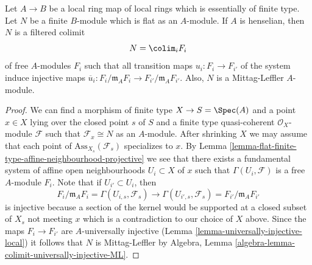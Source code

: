 \begin{lemma}
\label{lemma-flat-finite-type-local-colimit-free}
Let $A \to B$ be a local ring map of local rings which is essentially of
finite type. Let $N$ be a finite $B$-module which is flat as an $A$-module.
If $A$ is henselian, then $N$ is a filtered colimit
$$
N = \colim_i F_i
$$
of free $A$-modules $F_i$ such that all transition maps
$u_i : F_i \to F_{i'}$ of the system induce injective maps
$\overline{u}_i : F_i/\mathfrak m_AF_i \to F_{i'}/\mathfrak m_AF_{i'}$.
Also, $N$ is a Mittag-Leffler $A$-module.
\end{lemma}

\begin{proof}
We can find a morphism of finite type $X \to S = \Spec(A)$
and a point $x \in X$ lying over the closed point $s$ of $S$ and a finite
type quasi-coherent $\mathcal{O}_X$-module $\mathcal{F}$ such that
$\mathcal{F}_x \cong N$ as an $A$-module. After shrinking $X$
we may assume that each point of $\text{Ass}_{X_s}(\mathcal{F}_s)$ specializes
to $x$. By
Lemma \ref{lemma-flat-finite-type-affine-neighbourhood-projective}
we see that there exists a fundamental system of affine open neighbourhoods
$U_i \subset X$ of $x$ such that $\Gamma(U_i, \mathcal{F})$ is
a free $A$-module $F_i$. Note that if $U_{i'} \subset U_i$, then
$$
F_i/\mathfrak m_AF_i = \Gamma(U_{i, s}, \mathcal{F}_s)
\longrightarrow
\Gamma(U_{i', s}, \mathcal{F}_s) = F_{i'}/\mathfrak m_AF_{i'}
$$
is injective because a section of the kernel would be supported at
a closed subset of $X_s$ not meeting $x$ which is a contradiction
to our choice of $X$ above. Since the maps $F_i \to F_{i'}$ are
$A$-universally injective (Lemma \ref{lemma-universally-injective-local})
it follows that $N$ is
Mittag-Leffler by
Algebra, Lemma \ref{algebra-lemma-colimit-universally-injective-ML}.
\end{proof}
